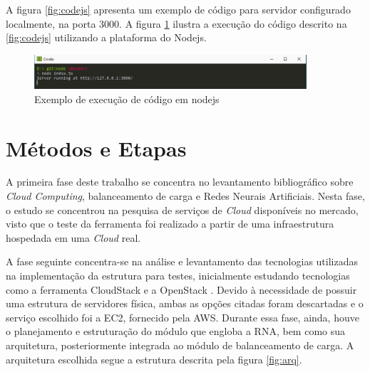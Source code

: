 A figura \ref{fig:codejs} apresenta um exemplo de código para servidor configurado localmente, na porta 3000. A figura \ref{fig:consolejs} ilustra a execução do código descrito na \ref{fig:codejs} utilizando a plataforma do Nodejs. 

\begin{figure}[htb]
	\caption{\label{fig:consolejs}Exemplo de execução de código em nodejs}
	\begin{center}
		\includegraphics[width=0.90\textwidth]{img/consolejs.png}
	\end{center}
\end{figure}
\section{Métodos e Etapas}\label{sec:metodos-etapas}

A primeira fase deste trabalho se concentra no levantamento bibliográfico sobre \textit{Cloud Computing}, balanceamento de carga e Redes Neurais Artificiais. Nesta fase, o estudo se concentrou na pesquisa de serviços de \textit{Cloud} disponíveis no mercado, visto que o teste da ferramenta foi realizado a partir de uma infraestrutura hospedada em uma \textit{Cloud} real. 

A fase seguinte concentra-se na análise e levantamento das tecnologias utilizadas na implementação da estrutura para testes, inicialmente estudando tecnologias como a ferramenta CloudStack \cite{cloudstack} e a OpenStack \cite{openstack}. Devido à necessidade de possuir uma estrutura de servidores física, ambas as opções citadas foram descartadas e o serviço escolhido foi a EC2\cite{AmazonEC2}, fornecido pela AWS. Durante essa fase, ainda, houve o planejamento e estruturação do módulo que engloba a RNA, bem como sua arquitetura, posteriormente integrada ao módulo de balanceamento de carga. A arquitetura escolhida segue a estrutura descrita pela figura \ref{fig:arq}. 

